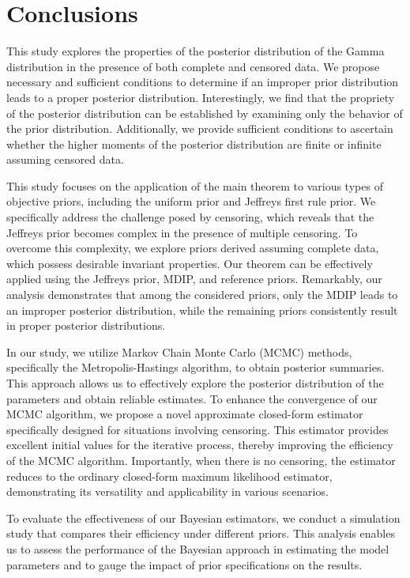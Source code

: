\documentclass[12pt]{article} %
\theoremstyle{plain}%
\theoremstyle{definition}
\theoremstyle{remark}
\begin{document}
\section{Conclusions}\label{sec:6}

This study explores the properties of the posterior distribution of the Gamma distribution in the presence of both complete and censored data. We propose necessary and sufficient conditions to determine if an improper prior distribution leads to a proper posterior distribution. Interestingly, we find that the propriety of the posterior distribution can be established by examining only the behavior of the prior distribution. Additionally, we provide sufficient conditions to ascertain whether the higher moments of the posterior distribution are finite or infinite assuming censored data.

This study focuses on the application of the main theorem to various types of objective priors, including the uniform prior and Jeffreys first rule prior. We specifically address the challenge posed by censoring, which reveals that the Jeffreys prior becomes complex in the presence of multiple censoring. To overcome this complexity, we explore priors derived assuming complete data, which possess desirable invariant properties. Our theorem can be effectively applied using the Jeffreys prior, MDIP, and reference priors. Remarkably, our analysis demonstrates that among the considered priors, only the MDIP leads to an improper posterior distribution, while the remaining priors consistently result in proper posterior distributions.

In our study, we utilize Markov Chain Monte Carlo (MCMC) methods, specifically the Metropolis-Hastings algorithm, to obtain posterior summaries. This approach allows us to effectively explore the posterior distribution of the parameters and obtain reliable estimates. To enhance the convergence of our MCMC algorithm, we propose a novel approximate closed-form estimator specifically designed for situations involving censoring. This estimator provides excellent initial values for the iterative process, thereby improving the efficiency of the MCMC algorithm. Importantly, when there is no censoring, the estimator reduces to the ordinary closed-form maximum likelihood estimator, demonstrating its versatility and applicability in various scenarios.

To evaluate the effectiveness of our Bayesian estimators, we conduct a simulation study that compares their efficiency under different priors. This analysis enables us to assess the performance of the Bayesian approach in estimating the model parameters and to gauge the impact of prior specifications on the results.
\end{document}
